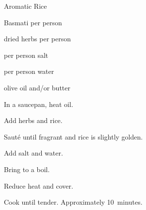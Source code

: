 \begin{recipe}{Aromatic Rice}{}{}

\begin{ingredients}
\item \C{\quarter} Basmati  per person
\item {} dried herbs per person
\item \tp{\eighth} per person salt
\item \C{\half} per person water
\item olive oil and/or butter
\end{ingredients}

\begin{directions}
\item In a saucepan, heat oil.
\item Add herbs and rice.
\item Sauté until fragrant and rice is slightly golden.
\item Add salt and water.
\item Bring to a boil.
\item Reduce heat and cover.
\item Cook until tender. Approximately 10~minutes.
\end{directions}

\end{recipe}
